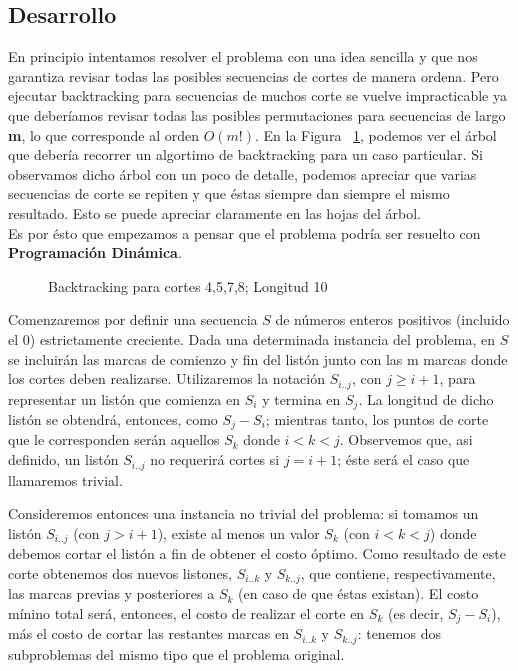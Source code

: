 \subsection{Desarrollo}
En principio intentamos resolver el problema con una idea sencilla y que nos garantiza revisar todas las posibles 
secuencias de cortes de manera ordena. Pero ejecutar backtracking para secuencias de muchos corte se vuelve 
impracticable ya que deber\'iamos revisar todas las posibles permutaciones para secuencias de largo \textbf{m}, lo que 
corresponde al orden  $O(m!)$. En la Figura ~\ref{fig:Backtracking}, podemos ver el \'arbol que deber\'ia recorrer un algortimo de backtracking 
para un caso particular. Si observamos dicho \'arbol con un poco de detalle, podemos apreciar que varias secuencias de corte 
se repiten y que \'estas siempre dan siempre el mismo resultado. Esto se puede apreciar claramente en las hojas del \'arbol. \\
Es por \'esto que empezamos a pensar que el problema podr\'ia ser resuelto con \textbf{Programaci\'on Din\'amica}.

\begin{figure}[h!]
	\caption{Backtracking para cortes 4,5,7,8; Longitud 10}
	\label{fig:Backtracking}
\end{figure}
Comenzaremos por definir una 
secuencia $S$ de n\'umeros enteros positivos (incluido el 0) estrictamente creciente. 
Dada una determinada instancia del problema, en $S$ se incluir\'an las marcas de comienzo y fin del list\'on junto con las
m marcas donde los cortes deben realizarse. Utilizaremos la notaci\'on $S_{i..j}$, con $j \geq i+1$, para representar
un list\'on que comienza en $S_{i}$ y termina en $S_{j}$. La longitud de dicho list\'on se obtendr\'a, entonces, 
como $S_{j} - S_{i}$; mientras tanto, los puntos de corte que le corresponden ser\'an aquellos $S_{k}$ donde $ i < k < j $.
Observemos que, asi definido, un list\'on $S_{i..j}$ no requerir\'a cortes si $ j = i + 1$; \'este ser\'a el caso que llamaremos trivial.

Consideremos entonces una instancia no trivial del problema: si tomamos un list\'on $S_{i..j}$ (con $j > i+1$), 
existe al menos un valor $S_{k}$ (con $i < k < j$) donde debemos cortar el list\'on a fin de obtener el costo \'optimo. 
Como resultado de este corte obtenemos dos nuevos listones, $S_{i..k}$ y $S_{k..j}$, que contiene, respectivamente, 
las marcas previas y posteriores a $S_{k}$ (en caso de que \'estas existan).
El costo m\'inino total ser\'a, entonces, el costo de realizar el corte en $S_{k}$ (es decir, $S_{j} - S_{i}$), 
m\'as el costo de cortar las restantes marcas en $S_{i..k}$ y $S_{k..j}$: tenemos dos subproblemas del mismo tipo 
que el problema original.

